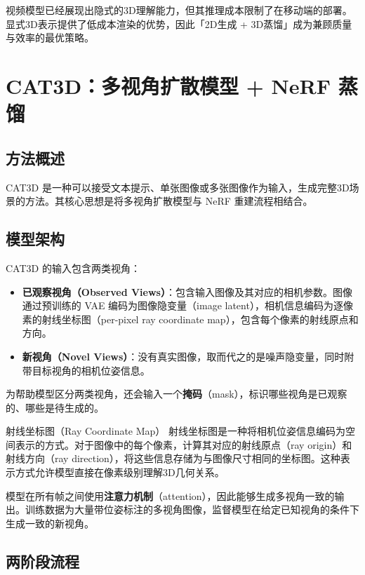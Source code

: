 \documentclass[a4paper]{article}
\begin{document}
视频模型已经展现出隐式的3D理解能力，但其推理成本限制了在移动端的部署。显式3D表示提供了低成本渲染的优势，因此「2D生成 + 3D蒸馏」成为兼顾质量与效率的最优策略。

\section{CAT3D：多视角扩散模型 + NeRF 蒸馏}

\subsection{方法概述}

CAT3D 是一种可以接受文本提示、单张图像或多张图像作为输入，生成完整3D场景的方法。其核心思想是将多视角扩散模型与 NeRF 重建流程相结合。

\subsection{模型架构}

CAT3D 的输入包含两类视角：

\begin{itemize}
    \item \textbf{已观察视角（Observed Views）}：包含输入图像及其对应的相机参数。图像通过预训练的 VAE 编码为图像隐变量（image latent），相机信息编码为逐像素的射线坐标图（per-pixel ray coordinate map），包含每个像素的射线原点和方向。
    \item \textbf{新视角（Novel Views）}：没有真实图像，取而代之的是噪声隐变量，同时附带目标视角的相机位姿信息。
\end{itemize}

为帮助模型区分两类视角，还会输入一个\textbf{掩码}（mask），标识哪些视角是已观察的、哪些是待生成的。

\begin{knowledgebox}{射线坐标图（Ray Coordinate Map）}
射线坐标图是一种将相机位姿信息编码为空间表示的方式。对于图像中的每个像素，计算其对应的射线原点（ray origin）和射线方向（ray direction），将这些信息存储为与图像尺寸相同的坐标图。这种表示方式允许模型直接在像素级别理解3D几何关系。
\end{knowledgebox}

模型在所有帧之间使用\textbf{注意力机制}（attention），因此能够生成多视角一致的输出。训练数据为大量带位姿标注的多视角图像，监督模型在给定已知视角的条件下生成一致的新视角。

\subsection{两阶段流程}
\end{document}
